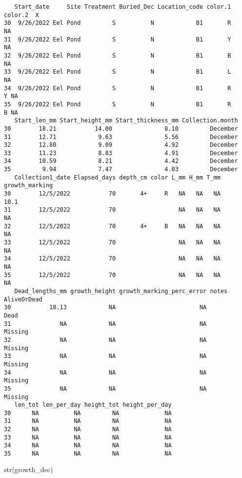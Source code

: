 \documentclass[
  letterpaper,
  DIV=11,
  numbers=noendperiod]{scrartcl}
\newenvironment{Shaded}{\begin{snugshade}}{\end{snugshade}}
\newcommand{\FunctionTok}[1]{\textcolor[rgb]{0.28,0.35,0.67}{#1}}
\newcommand{\NormalTok}[1]{\textcolor[rgb]{0.00,0.23,0.31}{#1}}
\begin{document}
\begin{verbatim}
   Start_date     Site Treatment Buried_Dec Location_code color.1 color.2  X
30  9/26/2022 Eel Pond         S          N            B1       R         NA
31  9/26/2022 Eel Pond         S          N            B1       Y         NA
32  9/26/2022 Eel Pond         S          N            B1       B         NA
33  9/26/2022 Eel Pond         S          N            B1       L         NA
34  9/26/2022 Eel Pond         S          N            B1       R       Y NA
35  9/26/2022 Eel Pond         S          N            B1       R       B NA
   Start_len_mm Start_height_mm Start_thickness_mm Collection.month
30        18.21           14.00               8.10         December
31        12.71            9.63               5.56         December
32        12.80            9.09               4.92         December
33        11.23            8.83               4.91         December
34        10.59            8.21               4.42         December
35         9.94            7.47               4.03         December
   Collection1_date Elapsed_days depth_cm color L_mm H_mm T_mm growth_marking
30        12/5/2022           70       4+     R   NA   NA   NA           10.1
31        12/5/2022           70                  NA   NA   NA             NA
32        12/5/2022           70       4+     B   NA   NA   NA             NA
33        12/5/2022           70                  NA   NA   NA             NA
34        12/5/2022           70                  NA   NA   NA             NA
35        12/5/2022           70                  NA   NA   NA             NA
   Dead_lengths_mm growth_height growth_marking_perc_error notes AliveOrDead
30           18.13            NA                        NA              Dead
31              NA            NA                        NA           Missing
32              NA            NA                        NA           Missing
33              NA            NA                        NA           Missing
34              NA            NA                        NA           Missing
35              NA            NA                        NA           Missing
   len_tot len_per_day height_tot height_per_day
30      NA          NA         NA             NA
31      NA          NA         NA             NA
32      NA          NA         NA             NA
33      NA          NA         NA             NA
34      NA          NA         NA             NA
35      NA          NA         NA             NA
\end{verbatim}

\begin{Shaded}
\begin{Highlighting}[]
\FunctionTok{str}\NormalTok{(growth\_dec)}
\end{Highlighting}
\end{Shaded}
\end{document}
